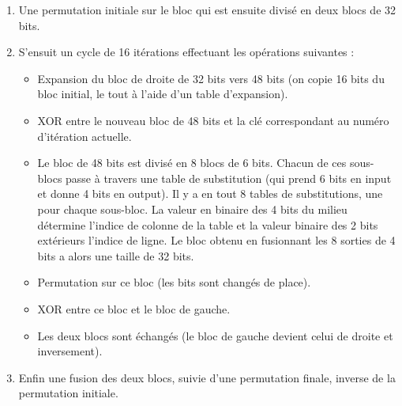 \documentclass[a4paper,12pt]{article}
\begin{document}
\begin{enumerate}
\item Une permutation initiale sur le bloc qui est ensuite divisé en deux blocs de 32 bits.

\item S'ensuit un cycle de 16 itérations effectuant les opérations suivantes :
\begin{itemize}
\item Expansion du bloc de droite de 32 bits vers 48 bits (on copie 16 bits du bloc initial, le tout à l'aide d'un table d'expansion). 
\item XOR entre le nouveau bloc de 48 bits et la clé correspondant au numéro d'itération actuelle.
\item Le bloc de 48 bits est divisé en 8 blocs de 6 bits. Chacun de ces sous-blocs passe à travers une table de substitution (qui prend 6 bits en input et donne 4 bits en output). Il y a en tout 8 tables de substitutions, une pour chaque sous-bloc. La valeur en binaire des 4 bits du milieu détermine l'indice de colonne de la table et la valeur binaire des 2 bits extérieurs l'indice de ligne. Le bloc obtenu en fusionnant les 8 sorties de 4 bits a alors une taille de 32 bits.
\item Permutation sur ce bloc (les bits sont changés de place).
\item XOR entre ce bloc et le bloc de gauche.
\item Les deux blocs sont échangés (le bloc de gauche devient celui de droite et inversement).
\end{itemize}


\item Enfin une fusion des deux blocs, suivie d'une permutation finale, inverse de la permutation initiale.
\end{enumerate}
\end{document}
